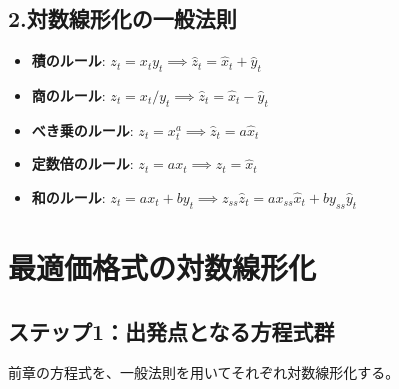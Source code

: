 \subsection*{2.対数線形化の一般法則}
\label{sec:appendix_optimal_price_derivation_log_linearization_rules}
\begin{itemize}
    \item\label{itm:appendix_optimal_price_derivation_loglin_rule1} \textbf{積のルール}: \(z_t=x_ty_t\implies\hat{z}_t=\hat{x}_t+\hat{y}_t\)
    \item\label{itm:appendix_optimal_price_derivation_loglin_rule2} \textbf{商のルール}: \(z_t=x_t/y_t\implies\hat{z}_t=\hat{x}_t-\hat{y}_t\)
    \item\label{itm:appendix_optimal_price_derivation_loglin_rule3} \textbf{べき乗のルール}: \(z_t=x_t^a\implies\hat{z}_t=a\hat{x}_t\)
    \item\label{itm:appendix_optimal_price_derivation_loglin_rule4} \textbf{定数倍のルール}: \(z_t=ax_t\implies\hat{z}_t=\hat{x}_t\)
    \item\label{itm:appendix_optimal_price_derivation_loglin_rule5} \textbf{和のルール}: \(z_t=ax_t+by_t\implies z_{ss}\hat{z}_t=ax_{ss}\hat{x}_t+by_{ss}\hat{y}_t\)
\end{itemize}

\section{最適価格式の対数線形化}
\label{sec:appendix_optimal_price_derivation_optimal_price_loglin}

\subsection*{ステップ1：出発点となる方程式群}
\label{sec:appendix_optimal_price_derivation_optimal_price_loglin_sub1}
前章の方程式を、一般法則を用いてそれぞれ対数線形化する。

